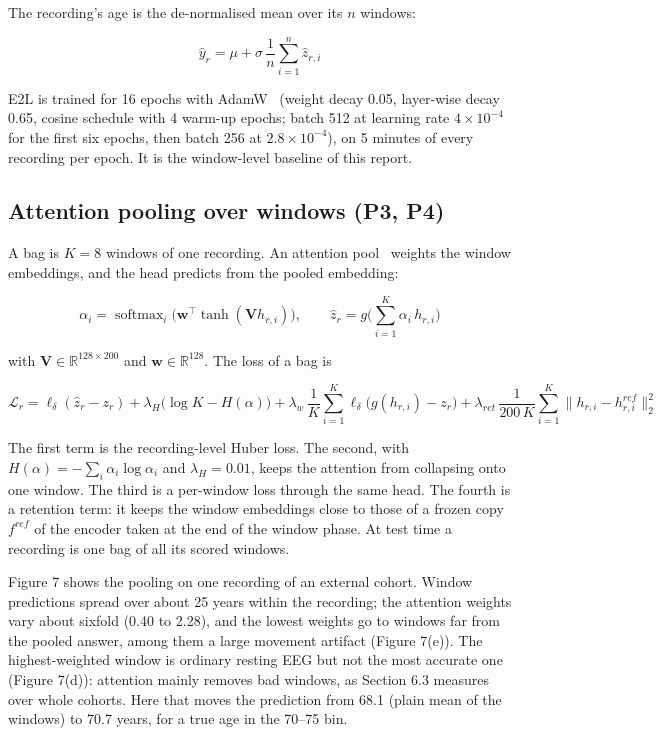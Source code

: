 \documentclass[11pt,a4paper]{article}
\begin{document}
The recording's age is the de-normalised mean over its $n$ windows:

\begin{equation}
\hat y_r = \mu + \sigma \, \frac{1}{n} \sum_{i=1}^{n} \hat z_{r,i} \tag{9}
\end{equation}

E2L is trained for 16 epochs with AdamW~\citep{loshchilov2019adamw} (weight decay 0.05, layer-wise decay 0.65, cosine schedule with 4 warm-up epochs; batch 512 at learning rate $4 \times 10^{-4}$ for the first six epochs, then batch 256 at $2.8 \times 10^{-4}$), on 5 minutes of every recording per epoch. It is the window-level baseline of this report.

\subsection{Attention pooling over windows (P3, P4)}

A bag is $K = 8$ windows of one recording. An attention pool~\citep{ilse2018abmil} weights the window embeddings, and the head predicts from the pooled embedding:

\begin{equation}
\alpha_i = \operatorname{softmax}_i \big( \mathbf{w}^\top \tanh(\mathbf{V} h_{r,i}) \big), \qquad \hat z_r = g\Big( \sum_{i=1}^{K} \alpha_i \, h_{r,i} \Big) \tag{10}
\end{equation}

with $\mathbf{V} \in \mathbb{R}^{128 \times 200}$ and $\mathbf{w} \in \mathbb{R}^{128}$. The loss of a bag is

\begin{equation}
\mathcal{L}_r = \ell_\delta(\hat z_r - z_r) + \lambda_H \big( \log K - H(\alpha) \big) + \lambda_w \, \frac{1}{K} \sum_{i=1}^{K} \ell_\delta\big( g(h_{r,i}) - z_r \big) + \lambda_{ret} \, \frac{1}{200\,K} \sum_{i=1}^{K} \lVert h_{r,i} - h_{r,i}^{ref} \rVert_2^2 \tag{11}
\end{equation}

The first term is the recording-level Huber loss. The second, with $H(\alpha) = -\sum_i \alpha_i \log \alpha_i$ and $\lambda_H = 0.01$, keeps the attention from collapsing onto one window. The third is a per-window loss through the same head. The fourth is a retention term: it keeps the window embeddings close to those of a frozen copy $f^{ref}$ of the encoder taken at the end of the window phase. At test time a recording is one bag of all its scored windows.

Figure 7 shows the pooling on one recording of an external cohort. Window predictions spread over about 25 years within the recording; the attention weights vary about sixfold (0.40 to 2.28), and the lowest weights go to windows far from the pooled answer, among them a large movement artifact (Figure 7(e)). The highest-weighted window is ordinary resting EEG but not the most accurate one (Figure 7(d)): attention mainly removes bad windows, as Section 6.3 measures over whole cohorts. Here that moves the prediction from 68.1 (plain mean of the windows) to 70.7 years, for a true age in the 70--75 bin.
\end{document}
